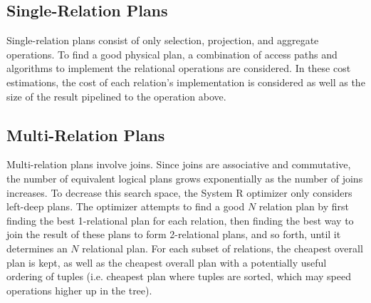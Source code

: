 \documentclass[12pt,titlepage]{article}
\begin{document}
    \subsection{Single-Relation Plans}
      Single-relation plans consist of only selection, projection, and aggregate operations. To find a good physical plan, a combination of access paths and algorithms to
      implement the relational operations are considered. In these cost estimations, the cost of each relation's implementation is considered as well as the size of the result
      pipelined to the operation above.

    \subsection{Multi-Relation Plans}
      Multi-relation plans involve joins. Since joins are associative and commutative, the number of equivalent logical plans grows exponentially as the number of joins
      increases. To decrease this search space, the System R optimizer only considers left-deep plans. The optimizer attempts to find a good $N$ relation plan by first
      finding the best 1-relational plan for each relation, then finding the best way to join the result of these plans to form 2-relational plans, and so forth, until
      it determines an $N$ relational plan. For each subset of relations, the cheapest overall plan is kept, as well as the cheapest overall plan with a potentially useful
      ordering of tuples (i.e. cheapest plan where tuples are sorted, which may speed operations higher up in the tree).
\end{document}

